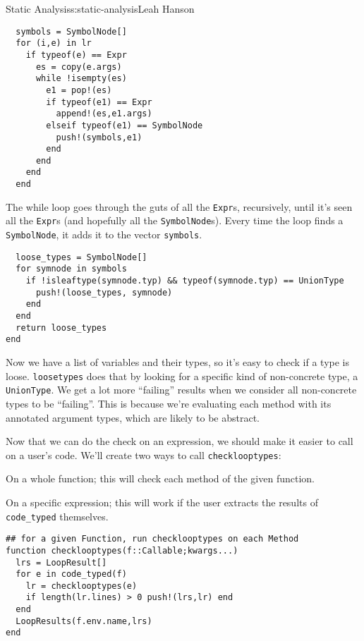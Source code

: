 \begin{aosachapter}{Static Analysis}{s:static-analysis}{Leah Hanson}
\begin{verbatim}
  symbols = SymbolNode[]
  for (i,e) in lr
    if typeof(e) == Expr
      es = copy(e.args)
      while !isempty(es)
        e1 = pop!(es)
        if typeof(e1) == Expr
          append!(es,e1.args)
        elseif typeof(e1) == SymbolNode
          push!(symbols,e1)
        end
      end
    end
  end
\end{verbatim}

The while loop goes through the guts of all the \texttt{Expr}s,
recursively, until it's seen all the \texttt{Expr}s (and hopefully all
the \texttt{SymbolNode}s). Every time the loop finds a
\texttt{SymbolNode}, it adds it to the vector \texttt{symbols}.

\begin{verbatim}
  loose_types = SymbolNode[]
  for symnode in symbols
    if !isleaftype(symnode.typ) && typeof(symnode.typ) == UnionType
      push!(loose_types, symnode)
    end
  end
  return loose_types
end
\end{verbatim}

Now we have a list of variables and their types, so it's easy to check
if a type is loose. \texttt{loosetypes} does that by looking for a
specific kind of non-concrete type, a \texttt{UnionType}. We get a lot
more ``failing'' results when we consider all non-concrete types to be
``failing''. This is because we're evaluating each method with its
annotated argument types, which are likely to be abstract.

\label{making-this-usable}

Now that we can do the check on an expression, we should make it easier
to call on a user's code. We'll create two ways to call
\texttt{checklooptypes}:

\begin{aosaenumerate}
\def\labelenumi{\arabic{enumi}.}
\item
  On a whole function; this will check each method of the given
  function.
\item
  On a specific expression; this will work if the user extracts the
  results of \texttt{code\_typed} themselves.
\end{aosaenumerate}

\begin{verbatim}
## for a given Function, run checklooptypes on each Method
function checklooptypes(f::Callable;kwargs...)
  lrs = LoopResult[]
  for e in code_typed(f)
    lr = checklooptypes(e)
    if length(lr.lines) > 0 push!(lrs,lr) end
  end
  LoopResults(f.env.name,lrs)
end


\end{verbatim}
\end{aosachapter}
